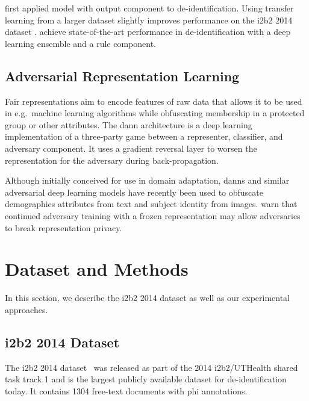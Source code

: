 %
\citet{dernoncourt2017identification} first applied  \citep{hochreiter1997long} model with  output component to de-identification.
%
Using transfer learning from a larger dataset slightly improves performance on the i2b2 2014 dataset \citep{lee2017transfer}.
%
\citet{liu2017identification} achieve state-of-the-art performance in de-identification with a deep learning ensemble and a rule component.

\subsection{Adversarial Representation Learning}
%
Fair representations \citep{zemel2013learning,hamm2015preserving} aim to encode features of raw data that allows it to be used in e.g.\ machine learning algorithms while obfuscating membership in a protected group or other attributes.
%
The \ac{dann} architecture \citep{ganin2016domain} is a deep learning implementation of a three-party game between a representer, classifier, and adversary component.
%
It uses a gradient reversal layer to worsen the representation for the adversary during back-propagation.

%
Although initially conceived for use in domain adaptation, \acp{dann} and similar adversarial deep learning models have recently been used to obfuscate demographics attributes \citep{elazar2018adversarial,li2018towards} from text and subject identity \citep{feutry2018learning} from images.
%
\citet{elazar2018adversarial} warn that continued adversary training with a frozen representation may allow adversaries to break representation privacy.

\section{Dataset and Methods}
%
In this section, we describe the i2b2 2014 dataset as well as our experimental approaches.

\subsection{i2b2 2014 Dataset}
%
The i2b2 2014 dataset~\citep{stubbs2015annotating} was released as part of the 2014 i2b2/UTHealth shared task track 1 and is the largest publicly available dataset for de-identification today.
%
It contains 1304 free-text documents with \ac{phi} annotations.
%

